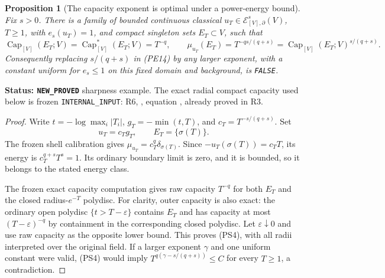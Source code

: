 \documentclass[11pt,a4paper]{article}
\numberwithin{equation}{section}
\newtheorem{proposition}[theorem]{Proposition}
\theoremstyle{definition}
\theoremstyle{remark}
\begin{document}
\begin{proposition}[The capacity exponent is optimal under a power-energy bound]
\label{prop:r11-power-capacity-exponent-sharp}
Fix $s>0$. There is a family of bounded continuous classical
$u_T\in\mathcal E^s_{[V],\partial}(V)$, $T\geq1$, with
$e_s(u_T)=1$, and compact singleton sets $E_T\subset V$, such that
\[
 \operatorname{Cap}_{[V]}(E_T;V)
  =\operatorname{Cap}_{[V]}^*(E_T;V)=T^{-q},\qquad
 \mu_{u_T}(E_T)=T^{-qs/(q+s)}
                =\operatorname{Cap}_{[V]}(E_T;V)^{s/(q+s)}.
 \tag{PS4}
\]
Consequently replacing $s/(q+s)$ in (PE14) by any larger
exponent, with a constant uniform for $e_s\leq1$ on this fixed
domain and background, is \texttt{FALSE}.
\end{proposition}

\noindent\textbf{Status: \texttt{NEW\_PROVED}} sharpness
example. The exact radial compact capacity used below is frozen
\texttt{INTERNAL\_INPUT}: R6,
, equation
,
already proved in R3.

\begin{proof}
Write $t=-\log\max_i|T_i|$, $g_T=-\min(t,T)$, and
$c_T=T^{-s/(q+s)}$. Set
\[
             u_T=c_Tg_T,\qquad E_T=\{\sigma(T)\}.
 \tag{PS5}
\]
The frozen shell calibration gives
$\mu_{u_T}=c_T^q\delta_{\sigma(T)}$.
Since $-u_T(\sigma(T))=c_TT$, its energy is
$c_T^{q+s}T^s=1$. Its ordinary boundary limit is zero, and
it is bounded, so it belongs to the stated energy class.

The frozen exact capacity computation gives raw capacity
$T^{-q}$ for both $E_T$ and the closed radius-$e^{-T}$
polydisc. For clarity, outer capacity is also exact: the ordinary
open polydisc $\{t>T-\varepsilon\}$ contains $E_T$ and has
capacity at most $(T-\varepsilon)^{-q}$ by containment in the
corresponding closed polydisc. Let $\varepsilon\downarrow0$
and use raw capacity as the opposite lower bound. This proves
(PS4), with all radii interpreted over the original field.
If a larger exponent $\gamma$ and one uniform constant were
valid, (PS4) would imply
$T^{q(\gamma-s/(q+s))}\leq C$ for every $T\geq1$, a
contradiction.
\end{proof}
\end{document}
